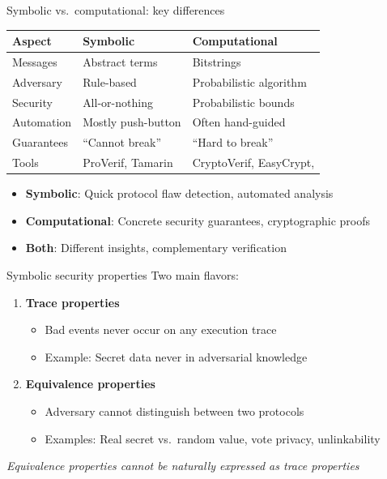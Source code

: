 \ifdefined\PRESENTATION\else\PassOptionsToClass{handout}{beamer}\fi\documentclass[aspectratio=169, lualatex]{beamer}
\begin{document}
\begin{frame}{Symbolic vs.\ computational: key differences}
	\begin{center}
		\begin{tabular}{|l|l|l|}
			\hline
			\textbf{Aspect} & \textbf{Symbolic} & \textbf{Computational}         \\
			\hline
			Messages        & Abstract terms    & Bitstrings                     \\
			\hline
			Adversary       & Rule-based        & Probabilistic algorithm        \\
			\hline
			Security        & All-or-nothing    & Probabilistic bounds           \\
			\hline
			Automation      & Mostly push-button & Often hand-guided             \\
			\hline
			Guarantees      & ``Cannot break''  & ``Hard to break''              \\
			\hline
			Tools           & ProVerif, Tamarin & CryptoVerif, EasyCrypt, \fstar \\
			\hline
		\end{tabular}
	\end{center}
	\vspace{1em}
	\begin{itemize}
		\item \textbf{Symbolic}: Quick protocol flaw detection, automated analysis
		\item \textbf{Computational}: Concrete security guarantees, cryptographic proofs
		\item \textbf{Both}: Different insights, complementary verification
	\end{itemize}
\end{frame}

\begin{frame}{Symbolic security properties}
	Two main flavors:
	\vspace{0.5em}
	\begin{enumerate}
		\item \textbf{Trace properties}
		      \begin{itemize}
			      \item Bad events never occur on any execution trace
			      \item Example: Secret data never in adversarial knowledge
		      \end{itemize}
		      \vspace{0.5em}
		\item \textbf{Equivalence properties}
		      \begin{itemize}
			      \item Adversary cannot distinguish between two protocols
			      \item Examples: Real secret vs.\ random value, vote privacy, unlinkability
		      \end{itemize}
	\end{enumerate}
	\vspace{0.5em}
	\begin{center}
		\textit{Equivalence properties cannot be naturally expressed as trace properties}
	\end{center}
\end{frame}
\end{document}
